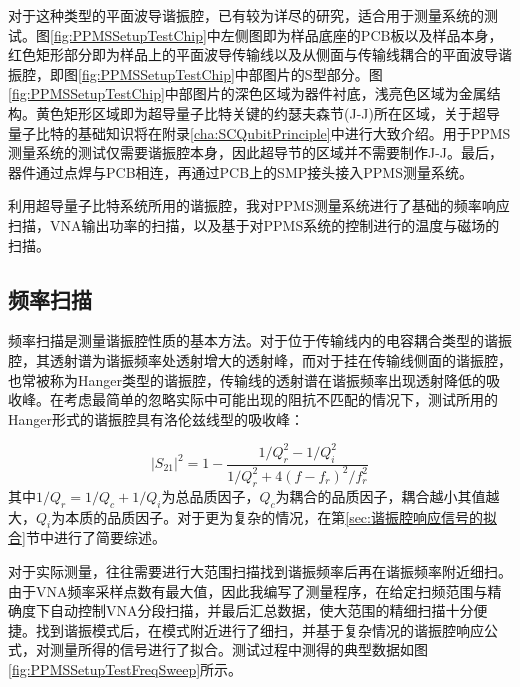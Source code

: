                   对于这种类型的平面波导谐振腔，已有较为详尽的研究\cite{Day2003,Wallraff2004Nature,schuster2007circuit,Gao2008Thesis,Barends2010APL,Geerlings2013}，适合用于测量系统的测试。图\ref{fig:PPMSSetupTestChip}中左侧图即为样品底座的PCB板以及样品本身，红色矩形部分即为样品上的平面波导传输线以及从侧面与传输线耦合的平面波导谐振腔，即图\ref{fig:PPMSSetupTestChip}中部图片的S型部分。图\ref{fig:PPMSSetupTestChip}中部图片的深色区域为器件衬底，浅亮色区域为金属结构。黄色矩形区域即为超导量子比特关键的约瑟夫森节(J-J)所在区域，关于超导量子比特的基础知识将在附录\ref{cha:SCQubitPrinciple}中进行大致介绍。用于PPMS测量系统的测试仅需要谐振腔本身，因此超导节的区域并不需要制作J-J。最后，器件通过点焊与PCB相连，再通过PCB上的SMP接头接入PPMS测量系统。

                  利用超导量子比特系统所用的谐振腔，我对PPMS测量系统进行了基础的频率响应扫描，VNA输出功率的扫描，以及基于对PPMS系统的控制进行的温度与磁场的扫描。




                  \subsection{频率扫描} %
                  \label{sub:频率扫描}

                  频率扫描是测量谐振腔性质的基本方法。对于位于传输线内的电容耦合类型的谐振腔，其透射谱为谐振频率处透射增大的透射峰\cite{Wallraff2004Nature,schuster2007circuit}，而对于挂在传输线侧面的谐振腔，也常被称为Hanger类型的谐振腔，传输线的透射谱在谐振频率出现透射降低的吸收峰\cite{Day2003,Gao2008Thesis,Geerlings2013}。在考虑最简单的忽略实际中可能出现的阻抗不匹配的情况下，测试所用的Hanger形式的谐振腔具有洛伦兹线型的吸收峰：

                  \begin{equation}
                  \label{eqn:simpleLorentzian}
                        |S_{21}|^2 = 1 - \frac{1/Q_r^2 - 1/Q_i^2}{1/Q_r^2 + 4 (f - f_r)^2/f_r^2} 
                  \end{equation}
                  其中$1/Q_r = 1/Q_c + 1/Q_i$为总品质因子，$Q_c$为耦合的品质因子，耦合越小其值越大，$Q_i$为本质的品质因子。对于更为复杂的情况，在第\ref{sec:谐振腔响应信号的拟合}节中进行了简要综述。

                  对于实际测量，往往需要进行大范围扫描找到谐振频率后再在谐振频率附近细扫。由于VNA频率采样点数有最大值，因此我编写了测量程序，在给定扫频范围与精确度下自动控制VNA分段扫描，并最后汇总数据，使大范围的精细扫描十分便捷。找到谐振模式后，在模式附近进行了细扫，并基于复杂情况的谐振腔响应公式，对测量所得的信号进行了拟合。测试过程中测得的典型数据如图\ref{fig:PPMSSetupTestFreqSweep}所示。
                  
